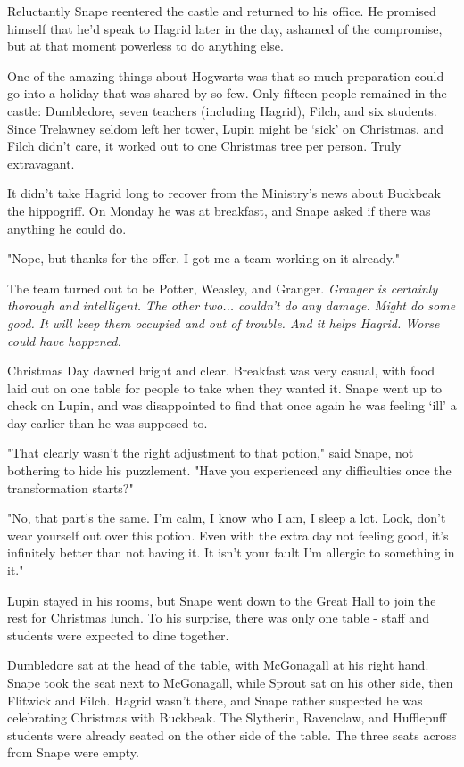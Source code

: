 \documentclass[a4paper,11pt]{article}
\begin{document}
Reluctantly Snape reentered the castle and returned to his office. He promised himself that he'd speak to Hagrid later in the day, ashamed of the compromise, but at that moment powerless to do anything else.

One of the amazing things about Hogwarts was that so much preparation could go into a holiday that was shared by so few. Only fifteen people remained in the castle: Dumbledore, seven teachers (including Hagrid), Filch, and six students. Since Trelawney seldom left her tower, Lupin might be `sick' on Christmas, and Filch didn't care, it worked out to one Christmas tree per person. Truly extravagant.

It didn't take Hagrid long to recover from the Ministry's news about Buckbeak the hippogriff. On Monday he was at breakfast, and Snape asked if there was anything he could do.

"Nope, but thanks for the offer. I got me a team working on it already."

The team turned out to be Potter, Weasley, and Granger. \emph{Granger is certainly thorough and intelligent. The other two... couldn't do any damage. Might do some good. It will keep them occupied and out of trouble. And it helps Hagrid. Worse could have happened.}

Christmas Day dawned bright and clear. Breakfast was very casual, with food laid out on one table for people to take when they wanted it. Snape went up to check on Lupin, and was disappointed to find that once again he was feeling `ill' a day earlier than he was supposed to.

"That clearly wasn't the right adjustment to that potion," said Snape, not bothering to hide his puzzlement. "Have you experienced any difficulties once the transformation starts?"

"No, that part's the same. I'm calm, I know who I am, I sleep a lot. Look, don't wear yourself out over this potion. Even with the extra day not feeling good, it's infinitely better than not having it. It isn't your fault I'm allergic to something in it."

Lupin stayed in his rooms, but Snape went down to the Great Hall to join the rest for Christmas lunch. To his surprise, there was only one table - staff and students were expected to dine together.

Dumbledore sat at the head of the table, with McGonagall at his right hand. Snape took the seat next to McGonagall, while Sprout sat on his other side, then Flitwick and Filch. Hagrid wasn't there, and Snape rather suspected he was celebrating Christmas with Buckbeak. The Slytherin, Ravenclaw, and Hufflepuff students were already seated on the other side of the table. The three seats across from Snape were empty.
\end{document}

